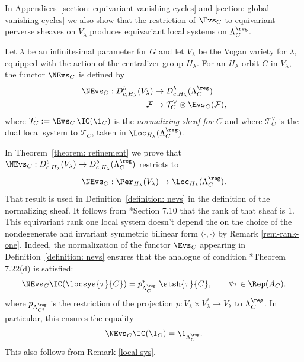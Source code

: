 \documentclass[11pt,letterpaper]{amsart}
\numberwithin{equation}{section}
\begin{document}
In Appendices~\ref{section: equivariant vanishing cycles} and \ref{section: global vanishing cycles} we also show that the restriction of $\Evs_C$ to equivariant perverse sheaves on $V_\lambda$ produces equivariant local systems on $\Lambda_{C}^\reg$. 


\begin{definition}\label{definition: nevs}
Let $\lambda$ be an infinitesimal parameter for $G$ and let $V_\lambda$ be the Vogan variety for $\lambda$, equipped with the action of the centralizer group $H_\lambda$.
For an $H_\lambda$-orbit $C$ in $V_\lambda$, the functor $\NEvs_C$
is defined by
\begin{align*}
    \NEvs_C: D^b_{c,H_\lambda}(V_\lambda) &\to D^b_{c,H_\lambda}(\Lambda_C^\reg)\\
    \mathcal{F} &\mapsto \mathcal{T}_C^\vee \otimes \Evs_C(\mathcal{F}),
\end{align*}
where 
$
\mathcal{T}_C := \Evs_C\, \IC(\1_C)
$ is the {\it normalizing sheaf for $C$} and where $\mathcal{T}^\vee_C$ is the dual local system to $\mathcal{T}_C$, taken in $\Loc_{H_\lambda}(\Lambda_C^\reg)$.
\end{definition}

In Theorem~\ref{theorem: refinement} we prove that $\NEvs_{C} : D^b_{c,H_\lambda}(V_\lambda) \to D^b_{c,H_\lambda}(\Lambda_C^\reg)$ restricts to
\[
\NEvs_{C} : \Per_{H_\lambda}(V_\lambda) \to \Loc_{H_\lambda}(\Lambda_{C}^\reg).
\]
That result is used in Definition~\ref{definition: nevs} in the definition of the normalizing sheaf. 
It follows from \cite{CFMMX22}*{Section 7.10} that the rank of that sheaf is $1$.
This equivariant rank one local system doesn't depend  the on the choice of the nondegenerate and invariant symmetric bilinear form $\langle \cdot , \cdot\rangle$
by Remark \ref{rem-rank-one}.
Indeed, the normalization of the functor $\Evs_C$ appearing in Definition~\ref{definition: nevs} ensures that the analogue of condition \cite{CFMMX22}*{Theorem 7.22(d)} is satisfied: 
\[
\NEvs_C\IC(\locsys{\tau}{C}) 
= 
p_{\Lambda_{C}^\reg}^*
\
\stsh{\tau}{C} ,
\qquad \forall \tau\in \Rep(A_C).
\]
where $p_{\Lambda_{C^*}^\reg}$ is the restriction of the projection $p: V_\lambda\times V_\lambda^* \to V_\lambda$ to $\Lambda_{C}^\reg$.
In particular, this ensures the equality
\[
\NEvs_C \IC(\1_C) =  \1_{\Lambda_C^\reg}.
\]
This also follows from Remark \ref{local-sys}.
\end{document}
